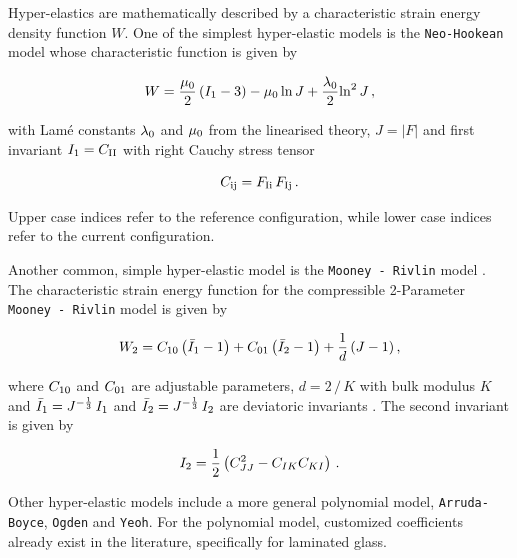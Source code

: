\documentclass[12pt,twoside]{article}
\theoremstyle{break}
\begin{document}
Hyper-elastics are mathematically described by a characteristic strain energy density function $W$. One of the simplest hyper-elastic models is the \texttt{Neo-Hookean} model \cite{Gha15} whose characteristic function is given by

\begin{equation}
    \label{eq:NeoHooke}
    W=\frac{\mu_{\rm{0}}}{2}\left(I_{\rm{1}}-3\right)-\mu_{\rm{0}}\,{\rm{ln}}\,J+\frac{\lambda_{\rm{0}}}{2}{\rm{ln}}^2\,J\,,
\end{equation}

with Lam\'{e} constants $\lambda_{\rm{0}}$ and $\mu_{\rm{0}}$ from the linearised theory, $J=\lvert F\rvert$ and first invariant $I_{\rm 1}=C_{\rm{II}}$ with right Cauchy stress tensor \cite{Gha15}

\begin{equation}
    C_{\rm{ij}}=F_{\rm{Ii}}\,F_{\rm{Ij}}\,.
\end{equation}

Upper case indices refer to the reference configuration, while lower case indices refer to the current configuration.

\bigbreak
Another common, simple hyper-elastic model is the \texttt{Mooney - Rivlin} model \cite{Aba13, Kum16}. The characteristic strain energy function for the compressible 2-Parameter \texttt{Mooney - Rivlin} model \cite{Kum16} is given by

\begin{equation}
    \label{eq:MooneyRivlinSEF}
    W_{\rm{2}} = C_{\rm{10}}\left(\bar{I}_{\rm{1}}-1\right)+C_{\rm{01}}\left(\bar{I}_{\rm{2}}-1\right)+\frac{1}{d}\,(J-1)\,,
\end{equation}

where $C_{\rm{10}}$ and $C_{\rm{01}}$ are adjustable parameters, $d=2\,/\,K$ with bulk modulus $K$ and $\bar{I}_{\rm{1}}=J^{-\frac{1}{3}}\,I_{\rm{1}}$ and $\bar{I}_{\rm{2}}=J^{-\frac{1}{3}}\,I_{\rm{2}}$ are deviatoric invariants \cite{Aba13}. The second invariant is given by

\begin{equation}
    I_{\rm{2}}=\frac{1}{2}\left(C^2_{JJ}-C_{IK}C_{KI}\right)\,.
\end{equation}

\bigbreak
Other hyper-elastic models \cite{Aba13} include a more general polynomial model, \texttt{Arruda-Boyce}, \texttt{Ogden} and \texttt{Yeoh}. For the polynomial model, customized coefficients \cite{Sam19} already exist in the literature, specifically for laminated glass.
\end{document}
